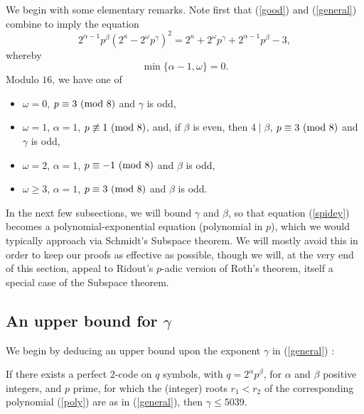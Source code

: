\documentclass{amsart}
\def\mod#1{{\ifmmode\text{\rm\ (mod~$#1$)}
\else\discretionary{}{}{\hbox{ }}\rm(mod~$#1$)\fi}}
\begin{document}
{We begin with some elementary remarks. Note first  that (\ref{good}) and (\ref{general}) combine to imply the equation
 \begin{equation} \label{spidey}
 2^{\alpha-1} p^\beta (2^\kappa-2^\omega p^\gamma)^2 = 2^\kappa+2^\omega p^\gamma +2^{\alpha-1} p^\beta-3,
 \end{equation}
 whereby
 \begin{equation} \label{spidey2}
 \min \{ \alpha-1,\omega \} = 0.
  \end{equation}
 Modulo $16$, we have one of
\begin{itemize}
\item $\omega=0$, $p \equiv 3 \mod{8}$ and $\gamma$ is odd,
\item $\omega=1$, $\alpha=1$, $p\not\equiv 1 \mod{8}$, and, if $\beta$ is even, then $4 \mid \beta$, $p \equiv 3 \mod{8}$ and $\gamma$ is odd,
\item $\omega=2$, $\alpha=1$, $p \equiv -1 \mod{8}$ and $\beta$ is odd,
\item $\omega \geq 3$, $\alpha=1$, $p \equiv 3 \mod{8}$ and $\beta$ is odd.
\end{itemize}

In the next few subsections, we will bound $\gamma$ and $\beta$, so that equation (\ref{spidey}) becomes a polynomial-exponential equation (polynomial in $p$), which we would typically approach via Schmidt's Subspace theorem. We will mostly avoid this in order to keep our proofs as effective as possible, though we will, at the very end of this section, appeal to Ridout's $p$-adic version of Roth's theorem, itself a special case of the Subspace theorem.

 \subsection{An upper bound for $\gamma$}
 
 We begin by deducing an upper bound upon the exponent $\gamma$ in (\ref{general}) : 
 \begin{prop} \label{prop-upper}
 If there exists a perfect $2$-code on $q$ symbols, with $q=2^\alpha p^\beta$, for $\alpha$ and $\beta$  positive integers, and $p$ prime, for which the (integer) roots $r_1<r_2$ of the corresponding polynomial (\ref{poly}) are as in (\ref{general}), then 
 $\gamma \leq 5039$.
 \end{prop}
 
}
\end{document}
